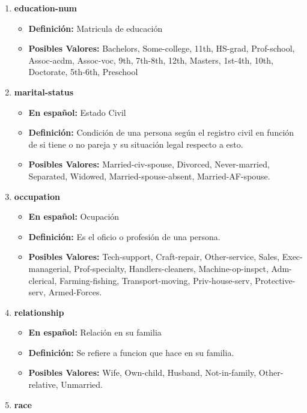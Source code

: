 \documentclass{article}
\begin{document}
\begin{enumerate}
\begin{itemize}
     \end{itemize}
     \item \textbf{education-num}
     \begin{itemize}
       \item \textbf{Definición:} Matricula de educación
       \item \textbf{Posibles Valores:}  Bachelors, Some-college, 11th, HS-grad, Prof-school, Assoc-acdm, Assoc-voc, 9th, 7th-8th, 12th, Masters, 1st-4th, 10th, Doctorate, 5th-6th, Preschool
     \end{itemize}
     \item \textbf{marital-status}
     \begin{itemize}
       \item \textbf{En español:} Estado Civil
       \item \textbf{Definición:} Condición de una persona según el registro civil en función de si tiene o no pareja y su situación legal respecto a esto.
       \item \textbf{Posibles Valores:}  Married-civ-spouse, Divorced, Never-married, Separated, Widowed, Married-spouse-absent, Married-AF-spouse.
     \end{itemize}
     \item \textbf{occupation}
     \begin{itemize}
       \item \textbf{En español:} Ocupación
       \item \textbf{Definición:} Es el oficio o profesión de una persona.
       \item \textbf{Posibles Valores:}  Tech-support, Craft-repair, Other-service, Sales, Exec-managerial, Prof-specialty, Handlers-cleaners, Machine-op-inspct, Adm-clerical, Farming-fishing, Transport-moving, Priv-house-serv, Protective-serv, Armed-Forces.
     \end{itemize}
     \item \textbf{relationship}
     \begin{itemize}
       \item \textbf{En español:} Relación en su familia
       \item \textbf{Definición:} Se refiere a funcion que hace en su familia.
       \item \textbf{Posibles Valores:} Wife, Own-child, Husband, Not-in-family, Other-relative, Unmarried.
     \end{itemize}
     \item \textbf{race}
     \begin{itemize}

\end{itemize}
\end{enumerate}
\end{document}
